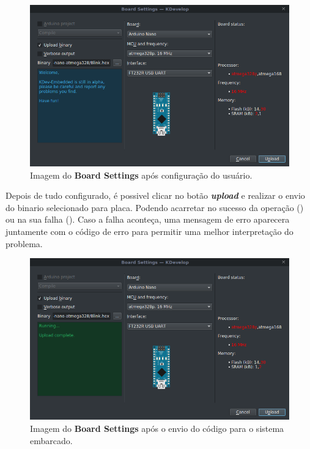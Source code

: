 \begin{figure}[!htb]
  \centering
  \caption[Board Settings após configuração para envio]{Imagem do \textbf{Board Settings} após configuração do usuário.}
  \label{fig:boardsettingsserial}
  \includegraphics[width=1\textwidth]{figuras/boardsettingsSerial.png}
\end{figure}

Depois de tudo configurado, é possivel clicar no botão \textbf{\textit{upload}} e realizar o envio do binario selecionado para placa. Podendo acarretar no sucesso da operação () ou na sua falha (). Caso a falha aconteça, uma mensagem de erro aparecera juntamente com o código de erro para permitir uma melhor interpretação do problema.


\begin{figure}[!htb]
  \centering
  \caption[Board Settings com sucesso no envio]{Imagem do \textbf{Board Settings} após o envio do código para o sistema embarcado.}
  \label{fig:boardsettingsdone}
  \includegraphics[width=1\textwidth]{figuras/boardsettingsdone.png}
\end{figure}

